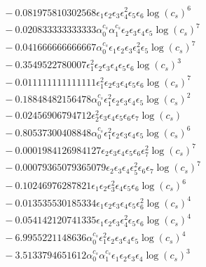 \documentclass[10pt]{article}
\begin{document}
\begin{align*}
&{}  - 0.081975810302568 \epsilon_{1} \epsilon_{2} \epsilon_{3} \epsilon_{4}^{2} \epsilon_{5} \epsilon_{6} \log{\left(c_{s} \right)}^{6} \\
&{}  - 0.020833333333333 \alpha_{0}^{c_s} \alpha_{1}^{c_s} \epsilon_{2} \epsilon_{3} \epsilon_{4} \epsilon_{5} \log{\left(c_{s} \right)}^{7} \\
&{}  - 0.041666666666667 \alpha_{0}^{c_s} \epsilon_{1} \epsilon_{2} \epsilon_{3} \epsilon_{4}^{2} \epsilon_{5} \log{\left(c_{s} \right)}^{7} \\
&{}  - 0.3549522780007 \epsilon_{1}^{2} \epsilon_{2} \epsilon_{3} \epsilon_{4} \epsilon_{5} \epsilon_{6} \log{\left(c_{s} \right)}^{3} \\
&{}  - 0.011111111111111 \epsilon_{1}^{2} \epsilon_{2} \epsilon_{3} \epsilon_{4} \epsilon_{5} \epsilon_{6} \log{\left(c_{s} \right)}^{7} \\
&{}  - 0.18848482156478 \alpha_{0}^{c_s} \epsilon_{1}^{2} \epsilon_{2} \epsilon_{3} \epsilon_{4} \epsilon_{5} \log{\left(c_{s} \right)}^{2} \\
&{}  - 0.02456906794712 \epsilon_{2}^{2} \epsilon_{3} \epsilon_{4} \epsilon_{5} \epsilon_{6} \epsilon_{7} \log{\left(c_{s} \right)} \\
&{}  - 0.80537300408848 \alpha_{0}^{c_s} \epsilon_{1}^{2} \epsilon_{2} \epsilon_{3} \epsilon_{4} \epsilon_{5} \log{\left(c_{s} \right)}^{6} \\
&{}  - 0.0001984126984127 \epsilon_{2} \epsilon_{3} \epsilon_{4} \epsilon_{5} \epsilon_{6} \epsilon_{7}^{2} \log{\left(c_{s} \right)}^{7} \\
&{}  - 0.00079365079365079 \epsilon_{2} \epsilon_{3} \epsilon_{4} \epsilon_{5}^{2} \epsilon_{6} \epsilon_{7} \log{\left(c_{s} \right)}^{7} \\
&{}  - 0.10246976287821 \epsilon_{1} \epsilon_{2} \epsilon_{3}^{2} \epsilon_{4} \epsilon_{5} \epsilon_{6} \log{\left(c_{s} \right)}^{6} \\
&{}  - 0.013535530185334 \epsilon_{1} \epsilon_{2} \epsilon_{3} \epsilon_{4} \epsilon_{5} \epsilon_{6}^{2} \log{\left(c_{s} \right)}^{4} \\
&{}  - 0.054142120741335 \epsilon_{1} \epsilon_{2} \epsilon_{3} \epsilon_{4}^{2} \epsilon_{5} \epsilon_{6} \log{\left(c_{s} \right)}^{4} \\
&{}  - 6.9955221148636 \alpha_{0}^{c_s} \epsilon_{1}^{2} \epsilon_{2} \epsilon_{3} \epsilon_{4} \epsilon_{5} \log{\left(c_{s} \right)}^{4} \\
&{}  - 3.5133794651612 \alpha_{0}^{c_s} \alpha_{1}^{c_s} \epsilon_{1} \epsilon_{2} \epsilon_{3} \epsilon_{4} \log{\left(c_{s} \right)}^{3} \\

\end{align*}
\end{document}
